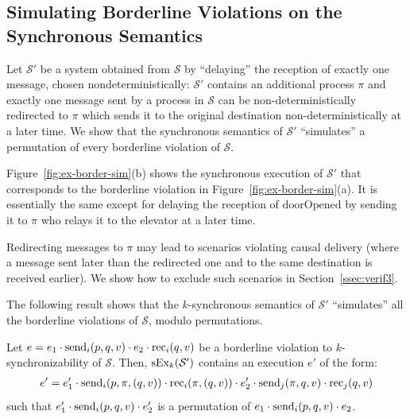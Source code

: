 \subsection{Simulating Borderline Violations on the Synchronous Semantics}\label{ssec:verif2}

Let $\mathcal{S'}$ be a system obtained from $\mathcal{S}$ by ``delaying'' the reception of exactly one message, chosen nondeterministically: $\mathcal{S'}$ contains an additional process $\pi$ and exactly one message sent by a process in $\mathcal{S}$ can be non-deterministically redirected to $\pi$ which sends it to the original destination non-deterministically at a later time.
We show that the synchronous semantics of $\mathcal{S'}$ ``simulates'' a permutation of every borderline violation of 
$\mathcal{S}$. 

Figure~\ref{fig:ex-border-sim}(b) shows the synchronous execution of $\mathcal{S'}$ that corresponds to the borderline violation in Figure~\ref{fig:ex-border-sim}(a). It is essentially the same except for delaying the reception of $\text{doorOpened}$ by sending it to $\pi$ who relays it to the elevator at a later time.

Redirecting messages to $\pi$ may lead to scenarios violating causal delivery (where a message sent later than the redirected one and to the same destination is received
earlier). We show how to exclude such scenarios in Section~\ref{ssec:verif3}.


The following result shows that the $k$-synchronous semantics of $\mathcal{S'}$ ``simulates'' all the borderline violations of $\mathcal{S}$, modulo permutations. 

\begin{lemma}
Let $e=e_1\cdot \send{i}{p,q,v}\cdot e_2\cdot \rec{i}{q,v}$ be a borderline violation to $k$-synchronizability of $\mathcal{S}$. Then, $\synchExec{\mathcal{S'}}{k}$ contains an execution $e'$ of the form: 
\begin{align*}
e'=e_1'\cdot \send{i}{p,\pi,(q,v)}\cdot \rec{i}{\pi,(q,v)}\cdot e_2'\cdot \send{j}{\pi,q,v}\cdot \rec{j}{q,v}
\end{align*}
such that $e_1'\cdot \send{i}{p,q,v} \cdot e_2'$ is a permutation of $e_1\cdot \send{i}{p,q,v}\cdot e_2$.
\end{lemma}


